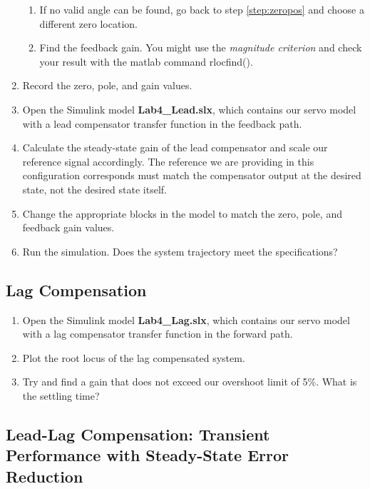 \documentclass[11pt,a4paper]{article}
\begin{document}
\begin{enumerate}
\begin{enumerate}
\item If no valid angle can be found, go back to step \ref{step:zeropos} and choose a different zero location.

\item Find the feedback gain. You might use the \textit{magnitude criterion} and check your result with the matlab command rlocfind(). 

\end{enumerate}

\item Record the zero, pole, and gain values.

\item Open the Simulink model \textbf{Lab4\_Lead.slx}, which contains our servo model with a lead compensator transfer function in the feedback path.

\item Calculate the steady-state gain of the lead compensator and scale our reference signal accordingly. The reference we are providing in this configuration corresponds must match the compensator output at the desired state, not the desired state itself.

\item Change the appropriate blocks in the model to match the zero, pole, and feedback gain values.

\item Run the simulation. Does the system trajectory meet the specifications? 

\end{enumerate}

\subsection{Lag Compensation}
\begin{enumerate}
\item Open the Simulink model \textbf{Lab4\_Lag.slx}, which contains our servo model with a lag compensator transfer function in the forward path.

\item Plot the root locus of the lag compensated system.

\item Try and find a gain that does not exceed our overshoot limit of 5\%. What is the settling time?

\end{enumerate}

\subsection{Lead-Lag Compensation: Transient Performance with Steady-State Error Reduction}
\end{document}

